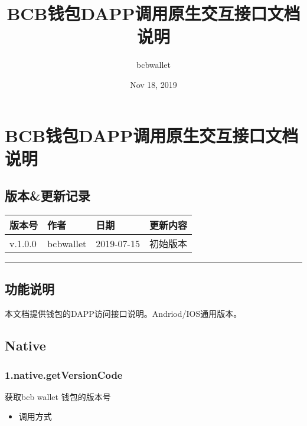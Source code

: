 \documentclass[letterpaper,10pt,english]{sphinxmanual}
\title{BCB钱包DAPP调用原生交互接口文档说明}
\date{Nov 18, 2019}
\author{bcbwallet}
\begin{document}
\pagestyle{empty}
\sphinxmaketitle
\pagestyle{plain}
\sphinxtableofcontents
\pagestyle{normal}
\label{\detokenize{index::doc}}



\chapter{BCB钱包DAPP调用原生交互接口文档说明}
\label{\detokenize{jsapi:bcbdapp}}\label{\detokenize{jsapi::doc}}

\section{版本\&更新记录}
\label{\detokenize{jsapi:id1}}

\begin{savenotes}\sphinxattablestart
\centering
\begin{tabulary}{\linewidth}[t]{|T|T|T|T|}
\hline
\sphinxstyletheadfamily 
版本号
&\sphinxstyletheadfamily 
作者
&\sphinxstyletheadfamily 
日期
&\sphinxstyletheadfamily 
更新内容
\\
\hline
v.1.0.0
&
bcbwallet
&
2019-07-15
&
初始版本
\\
\hline
\end{tabulary}
\par
\sphinxattableend\end{savenotes}


\bigskip\hrule\bigskip



\section{功能说明}
\label{\detokenize{jsapi:id2}}
本文档提供钱包的DAPP访问接口说明。Andriod/IOS通用版本。


\section{Native}
\label{\detokenize{jsapi:native}}

\subsection{1.native.getVersionCode}
\label{\detokenize{jsapi:native-getversioncode}}
获取bcb wallet 钱包的版本号
\begin{itemize}
\item {} 
调用方式

\end{itemize}
\end{document}
